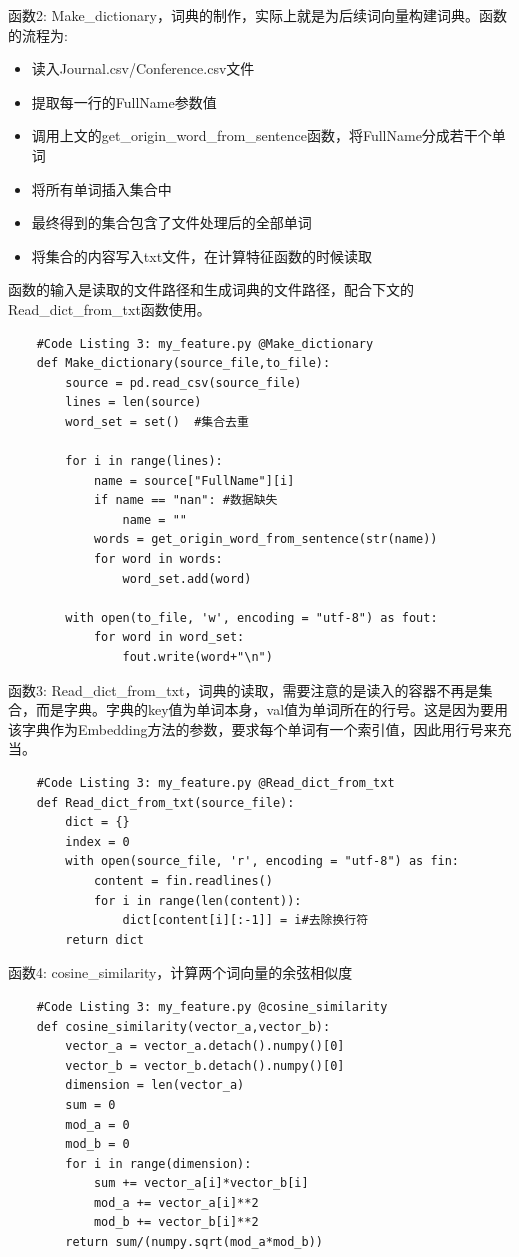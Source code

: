 \documentclass{mcmthesis}
\begin{document}
			\par 函数2: Make\_dictionary，词典的制作，实际上就是为后续词向量构建词典。函数的流程为:
			\begin{itemize}
				\item 读入Journal.csv/Conference.csv文件
				\item 提取每一行的FullName参数值
				\item 调用上文的get\_origin\_word\_from\_sentence函数，将FullName分成若干个单词
				\item 将所有单词插入集合中
				\item 最终得到的集合包含了文件处理后的全部单词
				\item 将集合的内容写入txt文件，在计算特征函数的时候读取
			\end{itemize}
			函数的输入是读取的文件路径和生成词典的文件路径，配合下文的Read\_dict\_from\_txt函数使用。
			{\setmainfont{Courier New Bold}              
				\begin{lstlisting}
	#Code Listing 3: my_feature.py @Make_dictionary
	def Make_dictionary(source_file,to_file):
		source = pd.read_csv(source_file)
		lines = len(source)
		word_set = set()  #集合去重

		for i in range(lines):
			name = source["FullName"][i]
			if name == "nan": #数据缺失
				name = ""
			words = get_origin_word_from_sentence(str(name))
			for word in words:
				word_set.add(word)

		with open(to_file, 'w', encoding = "utf-8") as fout:
			for word in word_set:
				fout.write(word+"\n")
				\end{lstlisting}
			}
			\par 函数3: Read\_dict\_from\_txt，词典的读取，需要注意的是读入的容器不再是集合，而是字典。字典的key值为单词本身，val值为单词所在的行号。这是因为要用该字典作为Embedding方法的参数，要求每个单词有一个索引值，因此用行号来充当。
			{\setmainfont{Courier New Bold}              
				\begin{lstlisting}
	#Code Listing 3: my_feature.py @Read_dict_from_txt
	def Read_dict_from_txt(source_file):
		dict = {}
		index = 0
		with open(source_file, 'r', encoding = "utf-8") as fin:
			content = fin.readlines()
			for i in range(len(content)):
				dict[content[i][:-1]] = i#去除换行符
		return dict
				\end{lstlisting}
			}
			\par 函数4: cosine\_similarity，计算两个词向量的余弦相似度
			{\setmainfont{Courier New Bold}              
				\begin{lstlisting}
	#Code Listing 3: my_feature.py @cosine_similarity
	def cosine_similarity(vector_a,vector_b):
		vector_a = vector_a.detach().numpy()[0]
		vector_b = vector_b.detach().numpy()[0]
		dimension = len(vector_a)
		sum = 0
		mod_a = 0
		mod_b = 0
		for i in range(dimension):
			sum += vector_a[i]*vector_b[i]
			mod_a += vector_a[i]**2
			mod_b += vector_b[i]**2
		return sum/(numpy.sqrt(mod_a*mod_b))
				\end{lstlisting}
			}
			
\end{document}
